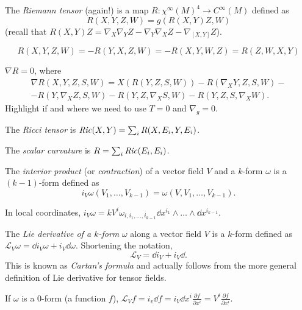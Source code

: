 \documentclass[a4paper,12pt]{book}
\newcommand{\pedantic}[1]{{#1}}
\begin{document}
\begin{definition}
The \emph{Riemann tensor} (again!) is a map $R\colon\chi^\infty(M)^4\to C^\infty(M)$ defined as
\[R(X,Y,Z,W)=g(R(X,Y)Z,W)\]
(recall that $R(X,Y)Z=\nabla_X\nabla_YZ-\nabla_Y\nabla_XZ-\nabla_{[X,Y]}Z$).
\end{definition}

\begin{exercise}
\[R(X,Y,Z,W)=-R(Y,X,Z,W)=-R(X,Y,W,Z)=R(Z,W,X,Y)\]
\label{riemannsymmetries}
\end{exercise}

\begin{exercise}
$\nabla R=0$, where
\begin{multline*}
\nabla R(X,Y,Z,S,W)=X(R(Y,Z,S,W))-R(\nabla_XY,Z,S,W)-\\
-R(Y,\nabla_XZ,S,W)-R(Y,Z,\nabla_XS,W)-R(Y,Z,S,\nabla_XW).\end{multline*}
Highlight if and where we need to use $T=0$ and $\nabla_g=0$.
\end{exercise}

\begin{definition}
The \emph{Ricci tensor} is $\text{\emph{Ric}}(X,Y)=\sum_i R(X,E_i,Y,E_i)$.
\end{definition}

\begin{definition}
The \emph{scalar curvature} is $R=\sum_i \text{\emph{Ric}}(E_i,E_i)$.
\end{definition}

\begin{definition}
The \emph{interior product} (or \emph{contraction}) of a vector field $V$ and a $k$-form $\omega$ is a $(k-1)$-form defined as
\[i_V\omega(V_1,\ldots,V_{k-1})=\omega(V,V_1,\ldots,V_{k-1}).\]
\end{definition}

In local coordinates, $i_V\omega=kV^i\omega_{i,i_1,\ldots,i_{k-1}}\dd x^{i_1}\wedge\ldots\wedge\dd x^{i_{k-1}}$.

\begin{definition}
The \emph{Lie derivative of a $k$-form} $\omega$ along a vector field $V$ is a $k$-form defined as $\mathcal L_V\omega=\dd i_V\omega+i_V\dd\omega$. Shortening the notation,
\[\mathcal L_V=\dd i_V+i_V\dd.\]
\pedantic{This is known as \emph{Cartan's formula} and actually follows from the more general definition of Lie derivative for tensor fields.}
\end{definition}

\begin{example}
If $\omega$ is a 0-form (a function $f$), $\mathcal L_Vf=i_v\dd f=i_V\dd x^i\frac{\partial f}{\partial x^i}=V^i\frac{\partial f}{\partial x^i}.$
\end{example}
\end{document}
